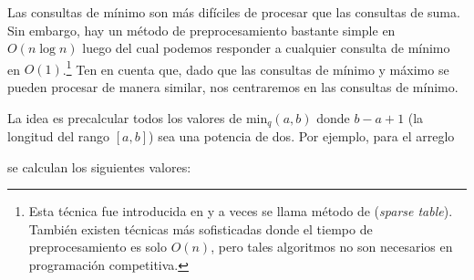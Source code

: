 
Las consultas de mínimo son más difíciles de procesar
que las consultas de suma.
Sin embargo, hay un método de preprocesamiento bastante simple
en $O(n \log n)$ luego del cual podemos responder a
cualquier consulta de mínimo en $O(1)$.\footnote{Esta técnica
    fue introducida en \cite{ben00} y a veces
    se llama método de  (\textit{sparse table}).
    También existen técnicas más sofisticadas \cite{fis06} donde
    el tiempo de preprocesamiento es solo $O(n)$, pero tales algoritmos
    no son necesarios en programación competitiva.}
Ten en cuenta que, dado que las consultas de mínimo y máximo se pueden
procesar de manera similar, nos centraremos en las consultas de mínimo.

La idea es precalcular todos los valores de
$\textrm{min}_q(a,b)$ donde
$b-a+1$ (la longitud del rango $[a,b]$) sea una potencia de dos.
Por ejemplo, para el arreglo

\begin{center}
\end{center}
se calculan los siguientes valores:

